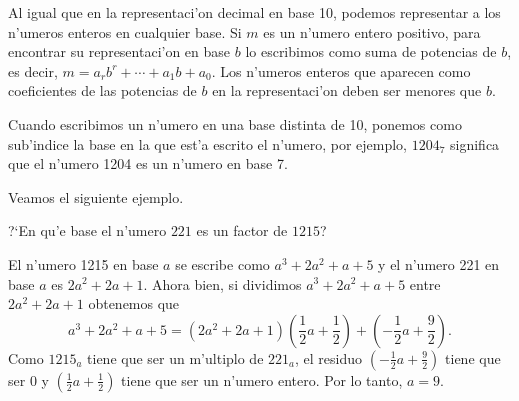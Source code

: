 \vei

\noindent Al igual  que en la representaci'on decimal en base 10, podemos representar a los n'umeros enteros en cualquier base. Si $m$ es un n'umero entero positivo, para encontrar su representaci'on en base $b$ lo
escribimos como suma de potencias de $b$, es decir, $m=a_r b^r+\cdots+a_1 b+a_0$. Los n'umeros
enteros que aparecen como coeficientes de las potencias de $b$ en la
representaci'on deben  ser menores que $b$.

\begin{observacion}
Cuando escribimos un n'umero en una base distinta de 10, ponemos como sub'indice
la base en la que est'a escrito el n'umero, por ejemplo, $1204_7$ significa que el
n'umero 1204 es un n'umero en base 7.
\end{observacion}


Veamos el siguiente ejemplo.
\begin{ejemplo}
?`En qu'e base el n'umero $221$ es un factor de $1215$?
\end{ejemplo}

El n'umero 1215 en base $a$ se escribe como $a^3 + 2a^2 + a + 5$ y el
n'umero 221 en base $a$ es $ 2a^2 + 2a + 1$.  Ahora bien, si dividimos 
$a^3 + 2a^2 + a + 5$ entre $ 2a^2 + 2a + 1$ obtenemos que
$$
   a^3 + 2a^2 + a + 5 = (2a^2 + 2a + 1)\left (\frac{1}{2}a+\frac{1}{2}\right)+
                        \left(-\frac{1}{2}a + \frac{9}{2}\right).
$$
Como $1215_a$ tiene que ser un m'ultiplo de $221_a$, el residuo
$\left(-\frac{1}{2}a + \frac{9}{2}\right)$ tiene que ser 0 y
$\left(\frac{1}{2}a + \frac{1}{2}\right )$ tiene que ser un n'umero entero.  Por lo
tanto, $a=9$.


\ve 
\ve


